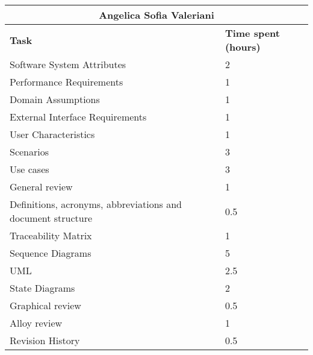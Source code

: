 \begin{table}[H]
  \center
  \begin{tabular}{l|l}
    \multicolumn{2}{c}{\textbf{Angelica Sofia Valeriani}} \\
    \hline
    \textbf{Task} & \textbf{Time spent (hours)}\\
    \hline
    Software System Attributes & 2 \\
    Performance Requirements & 1 \\
    Domain Assumptions & 1 \\
    External Interface Requirements & 1 \\
    User Characteristics & 1 \\
    Scenarios & 3 \\
    Use cases & 3 \\
    General review & 1 \\
    Definitions, acronyms, abbreviations and document structure & 0.5 \\
    Traceability Matrix & 1 \\
    Sequence Diagrams & 5 \\
    UML & 2.5 \\
    State Diagrams & 2 \\
    Graphical review & 0.5 \\
    Alloy review & 1 \\
    Revision History & 0.5 \\
  \end{tabular}
\end{table}